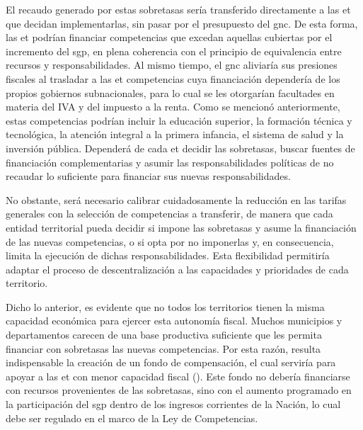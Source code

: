 El recaudo generado por estas sobretasas sería transferido directamente a las \gls{et} que decidan implementarlas, sin pasar por el presupuesto del \gls{gnc}. De esta forma, las \gls{et} podrían financiar competencias que excedan aquellas cubiertas por el incremento del \gls{sgp}, en plena coherencia con el principio de equivalencia entre recursos y responsabilidades. Al mismo tiempo, el \gls{gnc} aliviaría sus presiones fiscales al trasladar a las \gls{et} competencias cuya financiación dependería de los propios gobiernos subnacionales, para lo cual se les otorgarían facultades en materia del IVA y del impuesto a la renta. Como se mencionó anteriormente, estas competencias podrían incluir la educación superior, la formación técnica y tecnológica, la atención integral a la primera infancia, el sistema de salud y la inversión pública. Dependerá de cada \gls{et} decidir las sobretasas, buscar fuentes de financiación complementarias y asumir las responsabilidades políticas de no recaudar lo suficiente para financiar sus nuevas responsabilidades.

No obstante, será necesario calibrar cuidadosamente la reducción en las tarifas generales con la selección de competencias a transferir, de manera que cada entidad territorial pueda decidir si impone las sobretasas y asume la financiación de las nuevas competencias, o si opta por no imponerlas y, en consecuencia, limita la ejecución de dichas responsabilidades. Esta flexibilidad permitiría adaptar el proceso de descentralización a las capacidades y prioridades de cada territorio.

Dicho lo anterior, es evidente que no todos los territorios tienen la misma capacidad económica para ejercer esta autonomía fiscal. Muchos municipios y departamentos carecen de una base productiva suficiente que les permita financiar con sobretasas las nuevas competencias. Por esta razón, resulta indispensable la creación de un fondo de compensación, el cual serviría para apoyar a las \gls{et} con menor capacidad fiscal (\cite{MisionDescentralizacionFECET}). Este fondo no debería financiarse con recursos provenientes de las sobretasas, sino con el aumento programado en la participación del \gls{sgp} dentro de los ingresos corrientes de la Nación, lo cual debe ser regulado en el marco de la Ley de Competencias.


